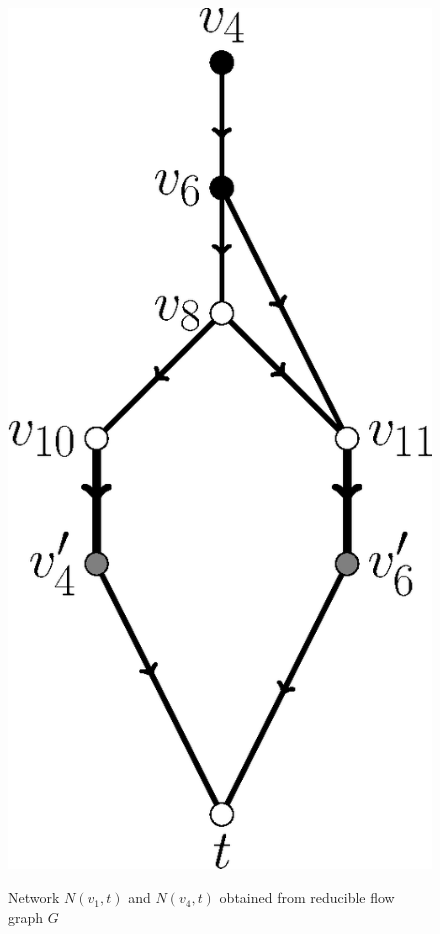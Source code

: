 \documentclass[11pt]{article}
\begin{document}
\begin{figure}
{\begin{minipage}[t]{0.5\linewidth}
          \includegraphics[scale=.425]{FASPacking-fig3b.eps}
          \label{fig:3b}
    \end{minipage}} 
    \caption{Network $N(v_1,t)$ and $N(v_4,t)$ obtained from reducible flow graph $G$}
     \label{fig:3}
 \end{figure}
\end{document}
